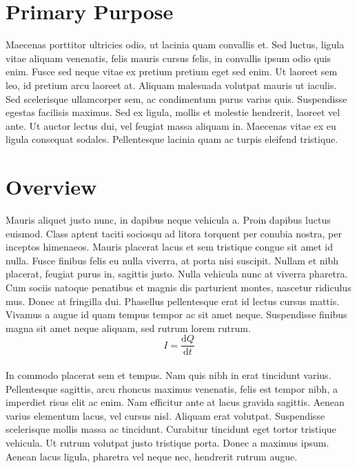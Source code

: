 \documentclass[letterpaper]{kuthesis}
\begin{document}
\section{Primary Purpose}
Maecenas porttitor ultricies odio, ut lacinia quam convallis et. Sed luctus, ligula vitae aliquam venenatis, felis mauris cursus felis, in convallis ipsum odio quis enim. Fusce sed neque vitae ex pretium pretium eget sed enim. Ut laoreet sem leo, id pretium arcu laoreet at. Aliquam malesuada volutpat mauris ut iaculis. Sed scelerisque ullamcorper sem, ac condimentum purus varius quis. Suspendisse egestas facilisis maximus. Sed ex ligula, mollis et molestie hendrerit, laoreet vel ante. Ut auctor lectus dui, vel feugiat massa aliquam in. Maecenas vitae ex eu ligula consequat sodales. Pellentesque lacinia quam ac turpis eleifend tristique.
\section{Overview}
Mauris aliquet justo nunc, in dapibus neque vehicula a. Proin dapibus luctus euismod. Class aptent taciti sociosqu ad litora torquent per conubia nostra, per inceptos himenaeos. Mauris placerat lacus et sem tristique congue sit amet id nulla. Fusce finibus felis eu nulla viverra, at porta nisi suscipit. Nullam et nibh placerat, feugiat purus in, sagittis justo. Nulla vehicula nunc at viverra pharetra. Cum sociis natoque penatibus et magnis dis parturient montes, nascetur ridiculus mus. Donec at fringilla dui. Phasellus pellentesque erat id lectus cursus mattis. Vivamus a augue id quam tempus tempor ac sit amet neque. Suspendisse finibus magna sit amet neque aliquam, sed rutrum lorem rutrum.
\\[3ex]
\begin{equation}
  \label{eq:1}
  I = \frac{\mathrm d Q}{\mathrm d t}
\end{equation} 
\\[3ex]
In commodo placerat sem et tempus. Nam quis nibh in erat tincidunt varius. Pellentesque sagittis, arcu rhoncus maximus venenatis, felis est tempor nibh, a imperdiet risus elit ac enim. Nam efficitur ante at lacus gravida sagittis. Aenean varius elementum lacus, vel cursus nisl. Aliquam erat volutpat. Suspendisse scelerisque mollis massa ac tincidunt. Curabitur tincidunt eget tortor tristique vehicula. Ut rutrum volutpat justo tristique porta. Donec a maximus ipsum. Aenean lacus ligula, pharetra vel neque nec, hendrerit rutrum augue.
\end{document}
